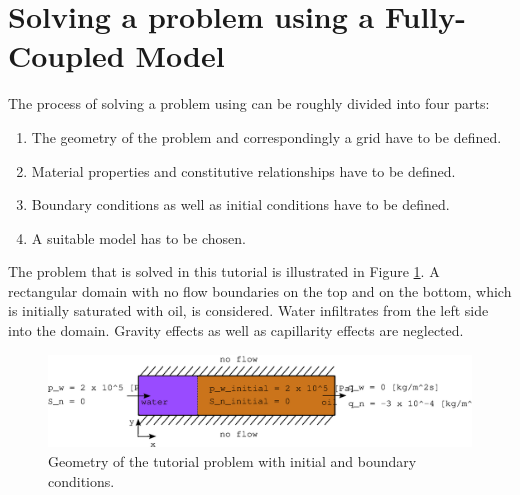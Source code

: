 \section[Fully-coupled model]{Solving a problem using a Fully-Coupled Model}\label{tutorial-coupled}

The process of solving a problem using \Dumux can be roughly divided into four parts:
\begin{enumerate}
 \item The geometry of the problem and correspondingly a grid have to be defined.
 \item Material properties and constitutive relationships have to be defined.
 \item Boundary conditions as well as initial conditions have to be defined.
 \item A suitable model has to be chosen.
\end{enumerate}

The problem that is solved in this tutorial is illustrated in Figure \ref{tutorial-coupled:problemfigure}. A rectangular domain with no flow boundaries on the top and on the bottom, which is initially saturated with oil, is considered. Water infiltrates from the left side into the domain. Gravity effects as well as capillarity effects are neglected.

\begin{figure}[h]
\centering
\includegraphics[width=0.9\linewidth,keepaspectratio]{EPS/tutorial-problemconfiguration}
\caption{Geometry of the tutorial problem with initial and boundary conditions.}\label{tutorial-coupled:problemfigure}
\end{figure}

